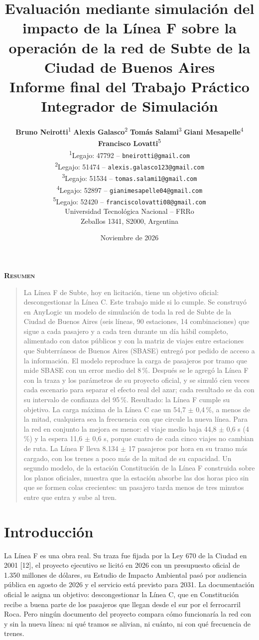 \documentclass{article}
\title{Evaluación mediante simulación del impacto de la Línea F sobre la operación de la red de Subte de la Ciudad de Buenos Aires\\[1ex]\large Informe final del Trabajo Práctico Integrador de Simulación}
\author{
  \textbf{Bruno Neirotti}\textsuperscript{1} \qquad \textbf{Alexis Galasco}\textsuperscript{2} \qquad \textbf{Tomás Salami}\textsuperscript{3} \qquad \textbf{Giani Mesapelle}\textsuperscript{4} \qquad \textbf{Francisco Lovatti}\textsuperscript{5} \\[0.5ex]
  \textsuperscript{1}Legajo: 47792 -- \texttt{bneirotti@gmail.com} \\
  \textsuperscript{2}Legajo: 51474 -- \texttt{alexis.galasco123@gmail.com} \\
  \textsuperscript{3}Legajo: 51534 -- \texttt{tomas.salami1@gmail.com} \\
  \textsuperscript{4}Legajo: 52897 -- \texttt{gianimesapelle04@gmail.com} \\
  \textsuperscript{5}Legajo: 52420 -- \texttt{franciscolovatti08@gmail.com} \\[0.5ex]
  Universidad Tecnológica Nacional -- FRRo \\
  Zeballos 1341, S2000, Argentina \\
}
\date{Noviembre de 2026}
\renewenvironment{abstract}
{\centerline{\large\bfseries\scshape Resumen}\begin{quote}}
{\end{quote}}
\begin{document}
\maketitle

\begin{abstract}
La Línea F de Subte, hoy en licitación, tiene un objetivo oficial: descongestionar la Línea C. Este trabajo
mide si lo cumple. Se construyó en AnyLogic un modelo de simulación de toda la red de Subte de la Ciudad de
Buenos Aires (seis líneas, 90 estaciones, 14 combinaciones) que sigue a cada pasajero y a cada tren durante un
día hábil completo, alimentado con datos públicos y con la matriz de viajes entre estaciones que Subterráneos
de Buenos Aires (SBASE) entregó por pedido de acceso a la información. El modelo reproduce la carga de
pasajeros por tramo que mide SBASE con un error medio del 8\,\%. Después se le agregó la Línea F con la traza
y los parámetros de su proyecto oficial, y se simuló cien veces cada escenario para separar el efecto real del
azar; cada resultado se da con su intervalo de confianza del 95\,\%. Resultado: la Línea F cumple su
objetivo. La carga máxima de la Línea C cae un 54,7 $\pm$ 0,4\,\%, a menos de la mitad, cualquiera sea la
frecuencia con que circule la nueva línea. Para la red en conjunto la mejora es menor: el viaje medio baja
44,8 $\pm$ 0,6 s (4\,\%) y la espera 11,6 $\pm$ 0,6 s, porque cuatro de cada cinco viajes no cambian de
ruta. La Línea F lleva 8.134 $\pm$ 17 pasajeros por hora en su tramo más cargado, con los trenes a poco más
de la mitad de su capacidad.
Un segundo modelo, de la estación Constitución de la Línea F construida sobre los planos oficiales, muestra
que la estación absorbe las dos horas pico sin que se formen colas crecientes: un pasajero tarda menos de tres
minutos entre que entra y sube al tren.
\end{abstract}

\section{Introducción}

La Línea F es una obra real. Su traza fue fijada por la Ley 670 de la Ciudad en 2001 [12], el proyecto
ejecutivo se licitó en 2026 con un presupuesto oficial de 1.350 millones de dólares, su Estudio de Impacto
Ambiental pasó por audiencia pública en agosto de 2026 y el servicio está previsto para 2031. La
documentación oficial le asigna un objetivo: descongestionar la Línea C, que en Constitución recibe a buena
parte de los pasajeros que llegan desde el sur por el ferrocarril Roca. Pero ningún documento del proyecto
compara cómo funcionaría la red con y sin la nueva línea: ni qué tramos se alivian, ni cuánto, ni con qué
frecuencia de trenes.
\end{document}

